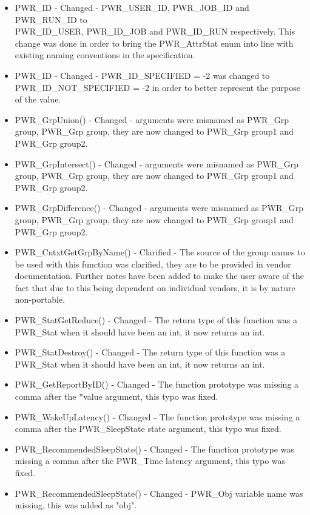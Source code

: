 \documentclass[12pt]{report} %
\begin{document}
\begin{appendices}
\begin{itemize}
    \item{PWR_ID - Changed - PWR_USER_ID, PWR_JOB_ID and PWR_RUN_ID to \\
    PWR_ID_USER, PWR_ID_JOB and PWR_ID_RUN respectively. This change was done in order to bring the PWR_AttrStat enum into line with existing naming conventions in the specification.}
    \item{PWR_ID - Changed - PWR_ID_SPECIFIED = -2 was changed to \\
    PWR_ID_NOT_SPECIFIED = -2 in order to better represent the purpose of the value.}
    \item{PWR_GrpUnion() - Changed - arguments were misnamed as PWR_Grp group, PWR_Grp group, they are now changed to PWR_Grp group1 and PWR_Grp group2.} 
    \item{PWR_GrpIntersect() - Changed - arguments were misnamed as PWR_Grp group, PWR_Grp group, they are now changed to PWR_Grp group1 and PWR_Grp group2.}
    \item{PWR_GrpDifference() - Changed - arguments were misnamed as PWR_Grp group, PWR_Grp group, they are now changed to PWR_Grp group1 and PWR_Grp group2.}
    \item{PWR_CntxtGetGrpByName() - Clarified - The source of the group names to be used with this function was clarified, they are to be provided in vendor documentation. Further notes have been added to make the user aware of the fact that due to this being dependent on individual vendors, it is by nature non-portable}.
    \item{PWR_StatGetReduce() - Changed - The return type of this function was a PWR_Stat when it should have been an int, it now returns an int.}
    \item{PWR_StatDestroy() - Changed - The return type of this function was a PWR_Stat when it should have been an int, it now returns an int.}
    \item{PWR_GetReportByID() - Changed - The function prototype was missing a comma after the *value argument, this typo was fixed.}
    \item{PWR_WakeUpLatency() - Changed - The function prototype was missing a comma after the PWR_SleepState state  argument, this typo was fixed.}
    \item{PWR_RecommendedSleepState() - Changed - The function prototype was missing a comma after the PWR_Time latency  argument, this typo was fixed.}
    \item{PWR_RecommendedSleepState() - Changed - PWR_Obj variable name was missing, this was added as "obj".}
\end{itemize}



\end{appendices}
\end{document}
